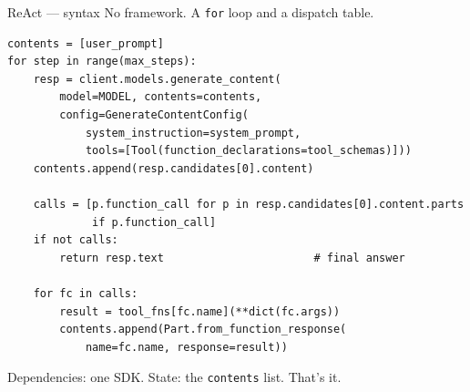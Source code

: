 \documentclass[aspectratio=169,10pt]{beamer}
\newcommand{\code}[1]{\texttt{\small #1}}
\begin{document}
\begin{frame}[fragile]{ReAct --- syntax}
No framework. A \code{for} loop and a dispatch table.

\begin{lstlisting}
contents = [user_prompt]
for step in range(max_steps):
    resp = client.models.generate_content(
        model=MODEL, contents=contents,
        config=GenerateContentConfig(
            system_instruction=system_prompt,
            tools=[Tool(function_declarations=tool_schemas)]))
    contents.append(resp.candidates[0].content)

    calls = [p.function_call for p in resp.candidates[0].content.parts
             if p.function_call]
    if not calls:
        return resp.text                       # final answer

    for fc in calls:
        result = tool_fns[fc.name](**dict(fc.args))
        contents.append(Part.from_function_response(
            name=fc.name, response=result))
\end{lstlisting}
\vspace{-0.3em}
{\small Dependencies: one SDK. State: the \code{contents} list. That's it.}
\end{frame}
\end{document}
